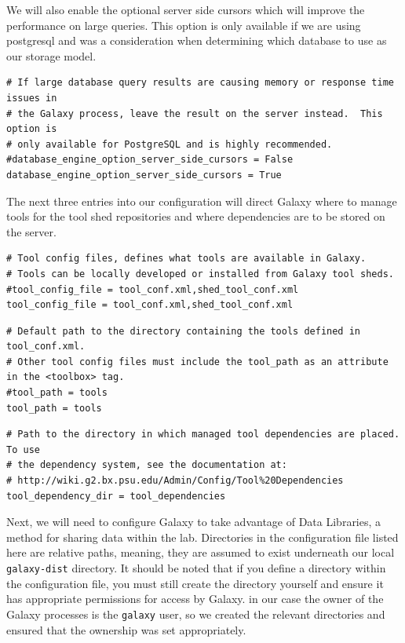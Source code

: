 \documentclass[a4paper,10pt]{article}
\begin{document}
We will also enable the optional server side cursors which will improve the performance on large queries.  This option is only available if we are using postgresql and was a consideration when determining which database to use as our storage model.

\begin{lstlisting}
# If large database query results are causing memory or response time issues in
# the Galaxy process, leave the result on the server instead.  This option is
# only available for PostgreSQL and is highly recommended.
#database_engine_option_server_side_cursors = False
database_engine_option_server_side_cursors = True
\end{lstlisting}

The next three entries into our configuration will direct Galaxy where to manage tools for the tool shed repositories and where dependencies are to be stored on the server.

\begin{lstlisting}
# Tool config files, defines what tools are available in Galaxy.
# Tools can be locally developed or installed from Galaxy tool sheds.
#tool_config_file = tool_conf.xml,shed_tool_conf.xml
tool_config_file = tool_conf.xml,shed_tool_conf.xml
\end{lstlisting}

\begin{lstlisting}
# Default path to the directory containing the tools defined in tool_conf.xml.
# Other tool config files must include the tool_path as an attribute in the <toolbox> tag.
#tool_path = tools
tool_path = tools
\end{lstlisting}

\begin{lstlisting}
# Path to the directory in which managed tool dependencies are placed.  To use
# the dependency system, see the documentation at:
# http://wiki.g2.bx.psu.edu/Admin/Config/Tool%20Dependencies
tool_dependency_dir = tool_dependencies
\end{lstlisting}

Next, we will need to configure Galaxy to take advantage of Data Libraries, a method for sharing data within the lab.  Directories in the configuration file listed here are relative paths, meaning, they are assumed to exist underneath our local \texttt{\footnotesize{galaxy-dist}} directory.  It should be noted that if you define a directory within the configuration file, you must still create the directory yourself and ensure it has appropriate permissions for access by Galaxy.  in our case the owner of the Galaxy processes is the \texttt{\footnotesize{galaxy}} user, so we created the relevant directories and ensured that the ownership was set appropriately.
\end{document}
